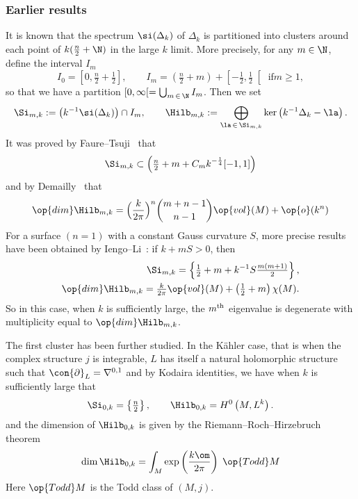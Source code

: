 \subsubsection*{Earlier results}

It is known that the spectrum $\si (\Delta_k)$ of $\Delta_k$ is partitioned into clusters around each point of $k (\frac{n}{2} + \N)$ in the large $k$ limit. More precisely, for any $m \in \N$, define the interval $I_m$
\[
I_0 = \left[0, \tfrac{n}{2} + \tfrac{1}{2}\right], \qquad I_m = \left(\tfrac{n}{2} +m\right) + \left[-\tfrac{1}{2}, \tfrac{1}{2} \right[\text{ if
} m \geqslant 1,
\]
so that we have a partition $[0,\infty [= \bigcup _{m\,\in\,\N} I_m$. Then we set
\begin{gather}\label{eq:def_Landau}
\Si_{m,k} := \bigl(k^{-1} \si (\Delta_k) \bigr) \cap I_m, \qquad \Hilb_{m,k} := \bigoplus_{\la\,\in\,\Si_{m,k}} \ker \left(k^{-1}\Delta_k - \la\right).
\end{gather}
It was proved by Faure--Tsuji~\cite{FaTs15} that
\begin{gather}\label{eq:Si_m:Faure_Tsujii}
\Si_{m,k} \subset
\Bigl(\tfrac{n}{2}+ m + C_m k^{-\frac{1}{4}} [-1,1] \Bigr)
\end{gather}
and by Demailly~\cite{Dem} that
\begin{gather}\label{eq:asymptot_Demailly}
\op{dim} \Hilb_{m,k} = \Bigl(\frac{k}{2 \pi} \Bigr)^n \binom{ {m+n-1}}{{n-1} } \op{vol} (M) + \op{o} (k^n)
\end{gather}
For a surface $(n=1)$ with a constant Gauss curvature $S$, more precise results have been obtained by Iengo--Li~\cite{IeLi94}: if $k + m S >0$, then
\begin{gather}\label{eq:surface_eignvalue_dim}
\begin{split}
\Si_{m,k} = \left\{ \tfrac{1}{2} + m + k^{-1} S \tfrac{m(m+1)}{2} \right\}, \\
\op{dim} \Hilb_{m,k} = \tfrac{k}{2 \pi} \op{vol} (M) + \left(\tfrac{1}{2} + m\right)
\chi (M).
\end{split}
\end{gather}
So in this case, when $k$ is sufficiently large, the $m^{\rm th}$ eigenvalue is degenerate with multiplicity equal to $\op{dim} \Hilb_{m,k}$.

The first cluster has been further studied. In the K\"ahler case, that is when the complex structure $j$ is integrable, $L$ has itself a natural holomorphic structure such that $\con{\partial}_L = \nabla^{0,1}$ and by Kodaira identities, we have when $k$ is sufficiently large that
\begin{gather}
\Si_{0,k} = \left\{ \tfrac{n}{2} \right\}, \qquad \Hilb_{0,k} = H^0 \left(M, L^k\right).
\end{gather}
and the dimension of $\Hilb_{0,k}$ is given by the Riemann--Roch--Hirzebruch theorem
\begin{gather}\label{eq:RRH}
\dim \Hilb_{0,k} = \int_M \exp \left(\frac{k\om}{2\pi} \right) \; \op{Todd} M
\end{gather}
Here $\op{Todd} M$ is the Todd class of $(M,j)$.

